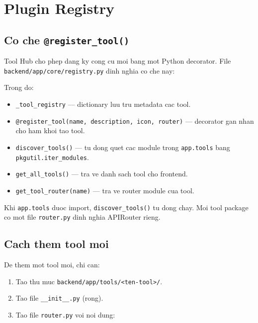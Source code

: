 \documentclass[12pt,a4paper]{article}
\begin{document}
\section{Plugin Registry}

\subsection{Co che \texttt{@register\_tool()}}

Tool Hub cho phep dang ky cong cu moi bang mot Python decorator. File
\texttt{backend/app/core/registry.py} dinh nghia co che nay:



Trong do:
\begin{itemize}
  \item \texttt{\_tool\_registry} --- dictionary luu tru metadata cac tool.
  \item \texttt{@register\_tool(name, description, icon, router)} --- decorator
        gan nhan cho ham khoi tao tool.
  \item \texttt{discover\_tools()} --- tu dong quet cac module trong
        \texttt{app.tools} bang \texttt{pkgutil.iter\_modules}.
  \item \texttt{get\_all\_tools()} --- tra ve danh sach tool cho frontend.
  \item \texttt{get\_tool\_router(name)} --- tra ve router module cua tool.
\end{itemize}

Khi \texttt{app.tools} duoc import, \texttt{discover\_tools()} tu dong chay.
Moi tool package co mot file \texttt{router.py} dinh nghia APIRouter rieng.

\subsection{Cach them tool moi}

De them mot tool moi, chi can:

\begin{enumerate}
  \item Tao thu muc \texttt{backend/app/tools/<ten-tool>/}.
  \item Tao file \texttt{\_\_init\_\_.py} (rong).
  \item Tao file \texttt{router.py} voi noi dung:
\end{enumerate}
\end{document}
